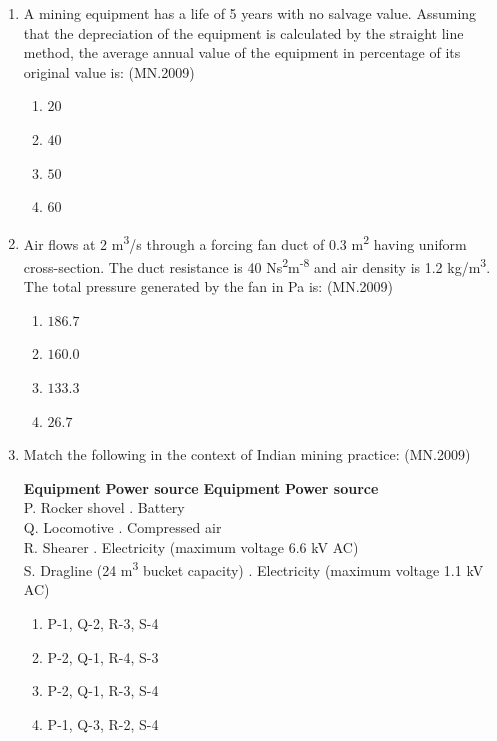 \documentclass[journal]{IEEEtran}
\numberwithin{equation}{enumi}
\numberwithin{figure}{enumi}
\begin{document}
\begin{enumerate}
    \item A mining equipment has a life of 5 years with no salvage value. Assuming that the depreciation of the equipment is calculated by the straight line method, the average annual value of the equipment in percentage of its original value is:
    \hfill{(MN.2009)}
    \begin{enumerate}
        \item $20$
        \item $40$
        \item $50$
        \item $60$
    \end{enumerate}

    \item Air flows at 2 m\textsuperscript{3}/s through a forcing fan duct of 0.3 m\textsuperscript{2} having uniform cross-section. The duct resistance is 40 Ns\textsuperscript{2}m\textsuperscript{-8} and air density is 1.2 kg/m\textsuperscript{3}. The total pressure generated by the fan in Pa is:
    \hfill{(MN.2009)}
    \begin{enumerate}
        \item $186.7$
        \item $160.0$
        \item $133.3$
        \item $26.7$
    \end{enumerate}

    \item Match the following in the context of Indian mining practice:
\hfill{(MN.2009)}
\begin{tabbing}
    \hspace{5cm} \= \textbf{Equipment} \hspace{6cm} \= \textbf{Power source} \kill
    \textbf{Equipment} \> \textbf{Power source} \\
    P. Rocker shovel . Battery \\
    Q. Locomotive . Compressed air \\
    R. Shearer . Electricity (maximum voltage 6.6 kV AC) \\
    S. Dragline (24 m\textsuperscript{3} bucket capacity) . Electricity (maximum voltage 1.1 kV AC) \\
    \end{tabbing}

    \begin{enumerate}
        \item P-1, Q-2, R-3, S-4
        \item P-2, Q-1, R-4, S-3
        \item P-2, Q-1, R-3, S-4
        \item P-1, Q-3, R-2, S-4
    \end{enumerate}


\end{enumerate}
\end{document}
